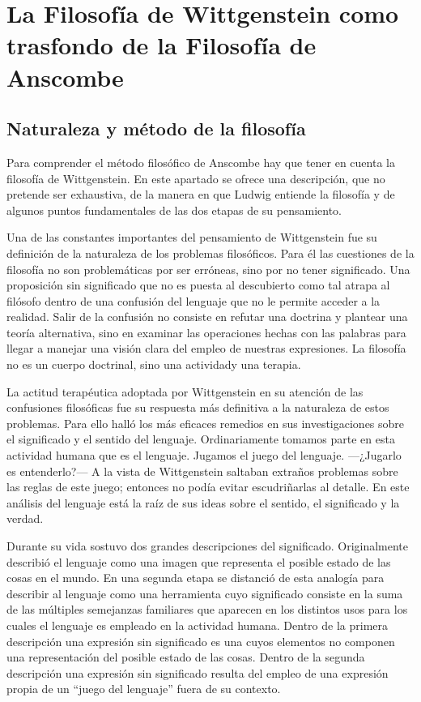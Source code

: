 \section{La Filosofía de Wittgenstein como trasfondo de la Filosofía de Anscombe}

\subsection{Naturaleza y método de la filosofía}

Para comprender el método filosófico de Anscombe hay que tener en cuenta la filosofía de Wittgenstein. En este apartado se ofrece una descripción, que no pretende ser exhaustiva, de la manera en que Ludwig entiende la filosofía y de algunos puntos fundamentales de las dos etapas de su pensamiento.

Una de las constantes importantes del pensamiento de Wittgenstein fue su definición de la naturaleza de los problemas filosóficos. Para él las cuestiones de la filosofía no son problemáticas por ser erróneas, sino por no tener significado.\autocite[Cf.~][\S4.003]{wittgenstein1922tractatuses} Una proposición sin significado que no es puesta al descubierto como tal atrapa al filósofo dentro de una confusión del lenguaje que no le permite acceder a la realidad. Salir de la confusión no consiste en refutar una doctrina y plantear una teoría alternativa, sino en examinar las operaciones hechas con las palabras para llegar a manejar una visión clara del empleo de nuestras expresiones. La filosofía no es un cuerpo doctrinal, sino una actividad\autocite[Cf.~][\S4.112]{wittgenstein1922tractatuses}y una terapia\autocite[Cf.~][\S133]{wittgenstein1953phiinv}.

La actitud terapéutica adoptada por Wittgenstein en su atención de las confusiones filosóficas fue su respuesta más definitiva a la naturaleza de estos problemas. Para ello halló los más eficaces remedios en sus investigaciones sobre el significado y el sentido del lenguaje. Ordinariamente tomamos parte en esta actividad humana que es el lenguaje. Jugamos el juego del lenguaje. ---¿Jugarlo es entenderlo?--- A la vista de Wittgenstein saltaban extraños problemas sobre las reglas de este juego; entonces no podía evitar escudriñarlas al detalle.\autocite[Cf.~][356]{monk1991duty} En este análisis del lenguaje está la raíz de sus ideas sobre el sentido, el significado y la verdad.

Durante su vida sostuvo dos grandes descripciones del significado. Originalmente describió el lenguaje como una imagen que representa el posible estado de las cosas en el mundo. En una segunda etapa se distanció de esta analogía para describir al lenguaje como una herramienta cuyo significado consiste en la suma de las múltiples semejanzas familiares que aparecen en los distintos usos para los cuales el lenguaje es empleado en la actividad humana. Dentro de la primera descripción una expresión sin significado es una cuyos elementos no componen una representación del posible estado de las cosas. Dentro de la segunda descripción una expresión sin significado resulta del empleo de una expresión propia de un ``juego del lenguaje'' fuera de su contexto.

